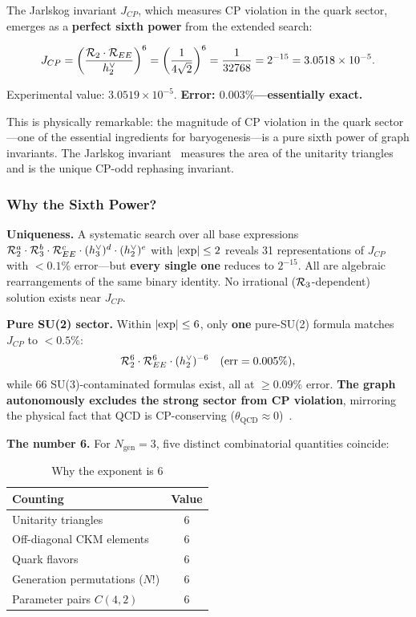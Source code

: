 The Jarlskog invariant $J_{CP}$, which measures CP violation in the quark sector, emerges as a \textbf{perfect sixth power} from the extended search:

\begin{equation}
J_{CP} = \left(\frac{\mathcal{R}_2 \cdot \mathcal{R}_{EE}}{h^\vee_2}\right)^6 = \left(\frac{1}{4\sqrt{2}}\right)^6 = \frac{1}{32768} = 2^{-15} = 3.0518 \times 10^{-5}.
\end{equation}

Experimental value: $3.0519 \times 10^{-5}$. \textbf{Error: $0.003\%$---essentially exact.}

This is physically remarkable: the magnitude of CP violation in the quark sector---one of the essential ingredients for baryogenesis---is a pure sixth power of graph invariants. The Jarlskog invariant~\cite{jarlskog1985} measures the area of the unitarity triangles and is the unique CP-odd rephasing invariant.

\subsubsection{Why the Sixth Power?}

\textbf{Uniqueness.} A systematic search over all base expressions $\mathcal{R}_2^a \cdot \mathcal{R}_3^b \cdot \mathcal{R}_{EE}^c \cdot (h^\vee_3)^d \cdot (h^\vee_2)^e$ with $|{\rm exp}| \leq 2$ reveals 31 representations of $J_{CP}$ with $< 0.1\%$ error---but \textbf{every single one} reduces to $2^{-15}$. All are algebraic rearrangements of the same binary identity. No irrational ($\mathcal{R}_3$-dependent) solution exists near $J_{CP}$.

\textbf{Pure SU(2) sector.} Within $|{\rm exp}| \leq 6$, only \textbf{one} pure-SU(2) formula matches $J_{CP}$ to $< 0.5\%$:
\begin{equation}
\mathcal{R}_2^6 \cdot \mathcal{R}_{EE}^6 \cdot (h^\vee_2)^{-6} \quad (\mathrm{err} = 0.005\%),
\end{equation}
while 66 SU(3)-contaminated formulas exist, all at $\geq 0.09\%$ error. \textbf{The graph autonomously excludes the strong sector from CP violation}, mirroring the physical fact that QCD is CP-conserving ($\theta_{\mathrm{QCD}} \approx 0$)~\cite{pdg2024}.

\textbf{The number 6.} For $N_{\mathrm{gen}} = 3$, five distinct combinatorial quantities coincide:

\begin{table}[h]
\centering
\caption{Why the exponent is 6}
\begin{tabular}{lc}
\hline\hline
Counting & Value \\
\hline
Unitarity triangles & 6 \\
Off-diagonal CKM elements & 6 \\
Quark flavors & 6 \\
Generation permutations ($N!$) & 6 \\
Parameter pairs $C(4, 2)$ & 6 \\
\hline\hline
\end{tabular}
\end{table}

